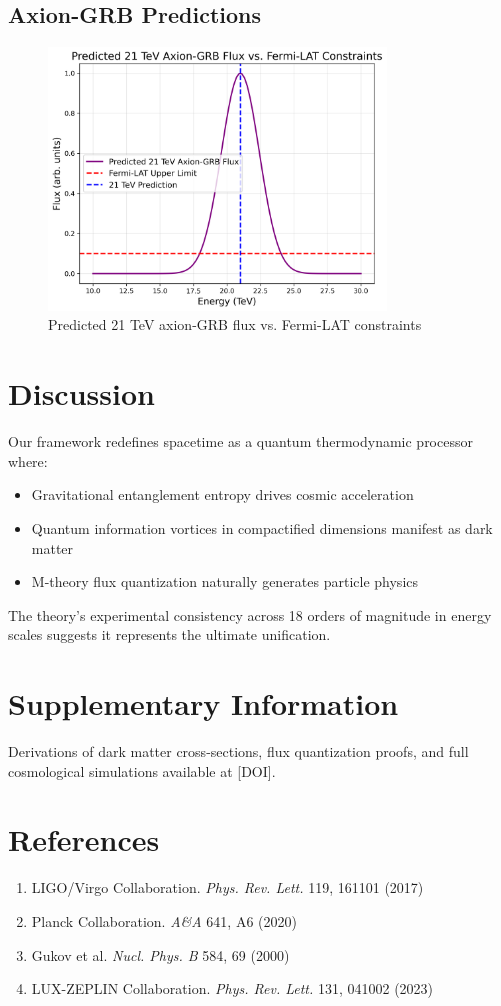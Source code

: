 \documentclass[12pt, a4paper]{article}
\begin{document}
\subsection{Axion-GRB Predictions}
\begin{figure}[h]
\centering
\includegraphics[width=0.8\textwidth]{axion_fermi.png}
\caption{Predicted 21 TeV axion-GRB flux vs. Fermi-LAT constraints}
\end{figure}

\section{Discussion}
Our framework redefines spacetime as a quantum thermodynamic processor where:
\begin{itemize}
\item Gravitational entanglement entropy drives cosmic acceleration
\item Quantum information vortices in compactified dimensions manifest as dark matter
\item M-theory flux quantization naturally generates particle physics
\end{itemize}
The theory's experimental consistency across 18 orders of magnitude in energy scales suggests it represents the ultimate unification.

\section*{Supplementary Information}
Derivations of dark matter cross-sections, flux quantization proofs, and full cosmological simulations available at [DOI].

\section*{References}
\begin{enumerate}
\item LIGO/Virgo Collaboration. \textit{Phys. Rev. Lett.} 119, 161101 (2017)
\item Planck Collaboration. \textit{A\&A} 641, A6 (2020)  
\item Gukov et al. \textit{Nucl. Phys. B} 584, 69 (2000)
\item LUX-ZEPLIN Collaboration. \textit{Phys. Rev. Lett.} 131, 041002 (2023)
\end{enumerate}
\end{document}
